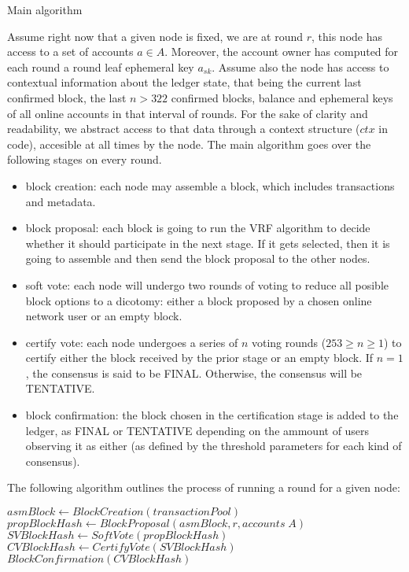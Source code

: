 \documentclass[10pt,a4paper]{article}
\begin{document}
\begin{section}{Main algorithm}

Assume right now that a given node is fixed, we are at round $r$,
this node has access to a set of accounts $a\in A$. Moreover,
the account owner has computed for each round a round 
leaf ephemeral key $a_{sk}$. Assume also the node has access to contextual
information about the ledger state, that being the current last confirmed block,
the last $n > 322$ confirmed blocks, balance and ephemeral keys of all 
online accounts in that interval of rounds. For the sake of clarity and readability, 
we abstract access to that data through a context structure ($ctx$ in code), accesible
at all times by the node.
The main algorithm goes over the following stages on every round.
\begin{itemize}
    \item block creation: each node may assemble a block, which includes 
transactions and metadata.
    \item block proposal: each block is going to run the VRF algorithm
    to decide whether it should participate in the next stage. If it
    gets selected, then it is going to assemble and then send the block 
    proposal to the other nodes.
    \item soft vote: each node will undergo two rounds of voting to reduce
    all posible block options to a dicotomy: either a block proposed by a 
    chosen online network user or an empty block.
    \item certify vote: each node undergoes a series of $n$ voting rounds
    ($253 \geq n \geq 1$) to certify either the block received by the prior
    stage or an empty block. If $n = 1$, the consensus is said to be FINAL.
    Otherwise, the consensus will be TENTATIVE.
    \item block confirmation: the block chosen in the certification stage
    is added to the ledger, as FINAL or TENTATIVE depending on the ammount
    of users observing it as either (as defined by the threshold parameters 
    for each kind of consensus).\\
\end{itemize} 

The following algorithm outlines the process of running a round for a given node:

\begin{algorithm}[H]
    \begin{algorithmic}[1]
    
    \State $asmBlock \gets BlockCreation(transactionPool)$
    \State $propBlockHash \gets BlockProposal(asmBlock, r, accounts\;A)$
    \State $SVBlockHash \gets SoftVote(propBlockHash)$
    \State $CVBlockHash \gets CertifyVote(SVBlockHash)$
    \State $BlockConfirmation(CVBlockHash)$


\end{algorithmic}
\end{algorithm}
\end{section}
\end{document}
